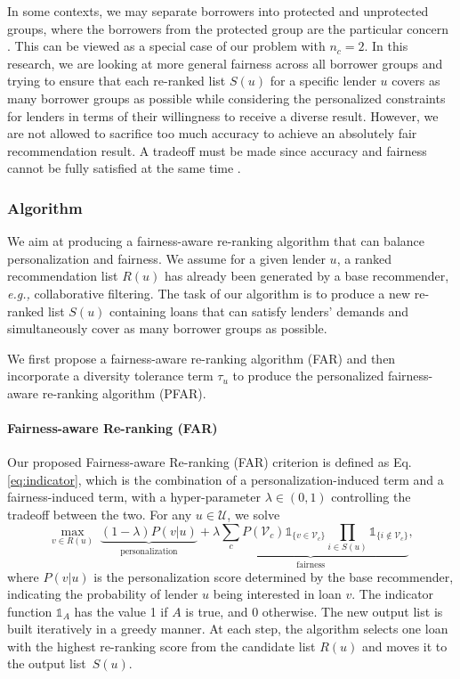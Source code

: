 In some contexts, we may separate borrowers into protected and unprotected groups, where the borrowers from the protected group are the particular concern \cite{zliobaite2015survey}. This can be viewed as a special case of our problem with $n_c=2$. In this research, we are looking at more general fairness across all borrower groups and trying to ensure that each re-ranked list $S(u)$ for a specific lender $u$ covers as many borrower groups as possible while considering the personalized constraints for lenders in terms of their willingness to receive a diverse result.
However, we are not allowed to sacrifice too much accuracy to achieve an absolutely fair recommendation result. A tradeoff must be made since accuracy and fairness cannot be fully satisfied at the same time \cite{burke_robin_multisided_nodate}.


\subsubsection{\textbf{Algorithm}}
\hfill

We aim at producing a fairness-aware re-ranking algorithm that can balance personalization and fairness. We assume for a given lender $u$, a ranked recommendation list $R(u)$ has already been generated by a base recommender, \emph{e.g.,} collaborative filtering. The task of our algorithm is to produce a new re-ranked list $S(u)$ containing loans that can satisfy lenders' demands and simultaneously cover as many borrower groups as possible.

We first propose a fairness-aware re-ranking algorithm (FAR) and then incorporate a diversity tolerance term $\tau_u$ to produce the personalized fairness-aware re-ranking algorithm (PFAR).


\paragraph{\textbf{Fairness-aware Re-ranking (FAR)}}
Our proposed Fairness-aware Re-ranking (FAR) criterion is defined as Eq.\eqref{eq:indicator}, which is the combination of a personalization-induced term and a fairness-induced term, with a hyper-parameter $\lambda\in(0,1)$ controlling the tradeoff between the two. For any $u\in \mathcal U$, we solve
\begin{equation}
\max_{v\in R(u)}\;\underbrace{(1-\lambda)P(v|u)}_{\text{personalization}} + \underbrace{\lambda\sum_{c}P(\mathcal V_c)\mathds{1}_{\{v\in \mathcal V_c\}}\prod_{i\in S(u)}\mathds{1}_{\{i\notin \mathcal V_c\}}}_{\text{fairness}},%
\label{eq:indicator}
\end{equation}
where $P(v|u)$ is the personalization score determined by the base recommender, indicating the probability of lender $u$ being interested in loan $v$. The indicator function $\mathds{1}_{A}$ has the value 1 if $A$ is true, and 0 otherwise. The new output list is built iteratively in a greedy manner. At each step, the algorithm selects one loan with the highest re-ranking score from the candidate list $R(u)$ and moves it to the output list~$S(u)$.


